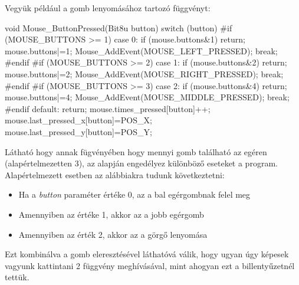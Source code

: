 Vegyük például a gomb lenyomásához tartozó függvényt:
\begin{cpp}

    void Mouse_ButtonPressed(Bit8u button) {
            switch (button) {
        #if (MOUSE_BUTTONS >= 1)
            case 0:
                if (mouse.buttons&1) return;
                mouse.buttons|=1;
                Mouse_AddEvent(MOUSE_LEFT_PRESSED);
                break;
        #endif
        #if (MOUSE_BUTTONS >= 2)
            case 1:
                if (mouse.buttons&2) return;
                mouse.buttons|=2;
                Mouse_AddEvent(MOUSE_RIGHT_PRESSED);
                break;
        #endif
        #if (MOUSE_BUTTONS >= 3)
            case 2:
                if (mouse.buttons&4) return;
                mouse.buttons|=4;
                Mouse_AddEvent(MOUSE_MIDDLE_PRESSED);
                break;
        #endif
            default:
                return;
            }
        mouse.times_pressed[button]++;
        mouse.last_pressed_x[button]=POS_X;
        mouse.last_pressed_y[button]=POS_Y;
    }

\end{cpp}

Látható hogy annak fügvényében hogy mennyi gomb található az egéren (alapértelmezetten 3), az alapján engedélyez különböző eseteket a program. Alapértelmezett esetben az alábbiakra tudunk következtetni:

\begin{itemize}
    \item Ha a \textit{button} paraméter értéke 0, az a bal egérgombnak felel meg
    \item Amennyiben az értéke 1, akkor az a jobb egérgomb
    \item Amennyiben az érték 2, akkor az a görgő lenyomása
\end{itemize}

Ezt kombinálva a gomb eleresztésével láthatóvá válik, hogy ugyan úgy képesek vagyunk kattintani 2 függvény meghívásával, mint ahogyan ezt a billentyűzetnél tettük. 